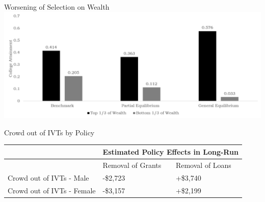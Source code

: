 \documentclass{beamer}
\begin{document}
\begin{frame}{Worsening of Selection on Wealth}
\includegraphics[width=\textwidth]{loanswealth.png}
\end{frame}

\begin{frame}{Crowd out of IVTs by Policy}

\begin{table}[]
\centering
\label{my-label}
\begin{tabular}{|l|l|l|}
\hline
                 & \multicolumn{2}{l|}{Estimated Policy Effects in Long-Run} \\ \hline
                 & Removal of Grants      & Removal of Loans     \\ \hline
Crowd out of IVTs - Male & -\$2,723                & +\$3,740              \\ \hline
Crowd out of IVTs - Female & -\$3,157                & +\$2,199              \\ \hline
\end{tabular}
\end{table}
\end{frame}
\end{document}
